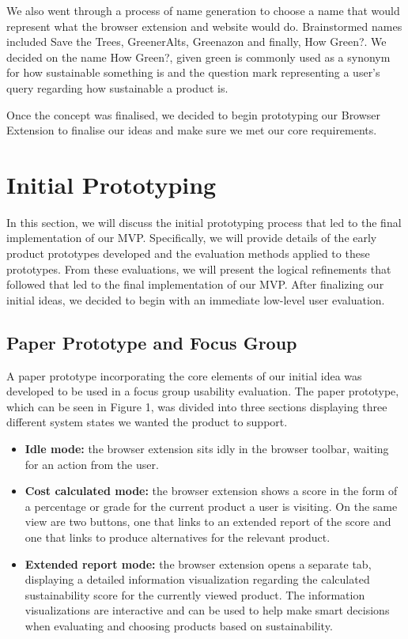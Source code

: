 \documentclass[a4,10pt,twocolumn]{article}
\begin{document}
We also went through a process of name generation to choose a name that would represent what the browser extension and website would do. Brainstormed names included Save the Trees, GreenerAlts, Greenazon and finally, How Green?. We decided on the name How Green?, given green is commonly used as a synonym for how sustainable something is and the question mark representing a user's query regarding how sustainable a product is.

Once the concept was finalised, we decided to begin prototyping our Browser Extension to finalise our ideas and make sure we met our core requirements.


\section*{Initial Prototyping}
In this section, we will discuss the initial prototyping process that led to the final implementation of our MVP. Specifically, we will provide details of the early product prototypes developed and the evaluation methods applied to these prototypes. From these evaluations, we will present the logical refinements that followed that led to the final implementation of our MVP. After finalizing our initial ideas, we decided to begin with an immediate low-level user evaluation. 

\subsection*{Paper Prototype and Focus Group}
A paper prototype incorporating the core elements of our initial idea was developed to be used in a focus group usability evaluation. The paper prototype, which can be seen in Figure 1, was divided into three sections displaying three different system states we wanted the product to support.
\begin{itemize}
    \item \textbf{Idle mode:} the browser extension sits idly in the browser toolbar, waiting for an action from the user.
    \item\textbf{Cost calculated mode:} the browser extension shows a score in the form of a percentage or grade for the current product a user is visiting. On the same view are two buttons, one that links to an extended report of the score and one that links to produce alternatives for the relevant product.
    \item\textbf{Extended report mode:} the browser extension opens a separate tab, displaying a detailed information visualization regarding the calculated sustainability score for the currently viewed product. The information visualizations are interactive and can be used to help make smart decisions when evaluating and choosing products based on sustainability.
\end{itemize}
\end{document}
